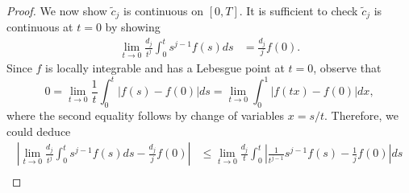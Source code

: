 \documentclass[10pt,a4paper]{amsart}
\newcommand{\abs}[1]{\left| #1 \right|}
\newcommand{\pr}[1]{ \left( #1 \right) }
\begin{document}
\begin{proof}
    We now show $\tilde{c}_j$ is continuous on $[0,T]$. 
    It is sufficient to check $\tilde{c}_j$ is continuous at $t=0$ by showing
    \begin{align*}
        \lim_{t \to 0} \frac{d_j}{t^j} \int^t_0 s^{j-1} f(s) ds &= \frac{d_j}{j}f(0).
    \end{align*}
    Since $f$ is locally integrable and has a Lebesgue point at $t=0$, observe that
    \begin{equation*}
        0 = \lim_{t \to 0} 
        \frac{1}{t} \int_0^t |f(s)-f(0)|ds  
        = 
        \lim_{t \to 0} 
        \int_0^1 |f(tx) - f(0)|dx,
    \end{equation*}
    where the second equality follows by change of variables $x = s/t$. Therefore, we could deduce
    \begin{align*}
        \abs{\lim_{t \to 0} \frac{d_j}{t^j} \int^t_0 s^{j-1} f(s) ds - \frac{d_j}{j}f(0)    
        } &\leq
        \lim_{t \to 0} 
        \frac{d_j}{t} \int_0^t \abs{ \frac{1}{t^{j-1}} s^{j-1} f(s) - \frac{1}{j} f(0)} ds \\

\end{align*}
\end{proof}
\end{document}
